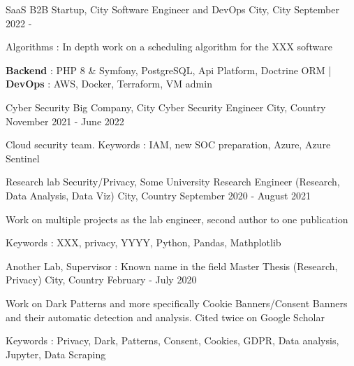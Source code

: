 


\begin{cventries}
	
	\cventry
	{SaaS B2B Startup, City} %
	{Software Engineer and DevOps} %
	{City, City} %
	{September 2022 - } %
	{ %
		\begin{cvitems}
			\item {Algorithms : In depth work on a scheduling algorithm for the XXX software}
			\item {\textbf{Backend} : PHP 8 \& Symfony, PostgreSQL, Api Platform, Doctrine ORM | \textbf{DevOps} : AWS, Docker, Terraform, VM admin}
		\end{cvitems}
	}
	
	\cventry
	{Cyber Security Big Company, City} %
	{Cyber Security Engineer} %
	{City, Country} %
	{November 2021 - June 2022} %
	{ %
		\begin{cvitems}
			\item {Cloud security team. Keywords : IAM, new SOC preparation, Azure, Azure Sentinel}
		\end{cvitems}
	}
	
	\cventry
	{Research lab Security/Privacy, Some University} %
	{Research Engineer (Research, Data Analysis, Data Viz)} %
	{City, Country} %
	{September 2020 - August 2021} %
	{ %
		\begin{cvitems}
			\item {Work on multiple projects as the lab engineer, second author to one publication}
			\item {Keywords : XXX, privacy, YYYY, Python, Pandas, Mathplotlib}
		\end{cvitems}
	}
	
	\cventry
	{Another Lab, Supervisor : Known name in the field} %
	{Master Thesis (Research, Privacy)} %
	{City, Country} %
	{February - July 2020} %
	{ %
		\begin{cvitems}
			\item {Work on Dark Patterns and more specifically Cookie Banners/Consent Banners and their automatic detection and analysis. Cited twice on Google Scholar}
			\item {Keywords : Privacy, Dark, Patterns, Consent, Cookies, GDPR, Data analysis, Jupyter, Data Scraping}
		\end{cvitems}
	}
	

\end{cventries}
